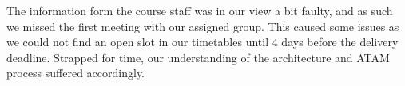 The information form the course staff was in our view a bit faulty, and as such
we missed the first meeting with our assigned group.  This caused some issues
as we could not find an open slot in our timetables until 4 days before the
delivery deadline.  Strapped for time, our understanding of the architecture
and ATAM process suffered accordingly.

